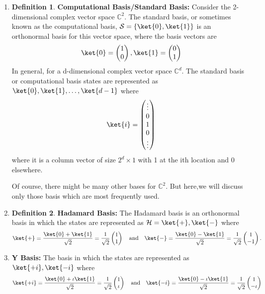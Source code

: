 \documentclass[12pt, oneside]{book}
\theoremstyle{definition}
\newtheorem{definition}{Definition}[section]
\theoremstyle{definition}
\theoremstyle{remark}
\begin{document}
\begin{enumerate}
    \item \begin{definition}
        \textbf{Computational Basis/Standard Basis:} Consider the 2-dimensional complex vector space $\mathbb{C}^2$. The standard basis, or sometimes known as the computational basis, $\mathcal{S}=\{\ket{0},\ket{1}\}$ is an orthonormal basis for this vector space, where the basis vectors are
        \[
        \ket{0}=\begin{pmatrix} 1 \\ 0 \end{pmatrix}, \ket{1}=\begin{pmatrix} 0 \\ 1 \end{pmatrix}
        \]
        In general, for a d-dimensional complex vector space $\mathbb{C}^d$. The standard basis or computational basis states are represented as $\ket{0},\ket{1},\ldots,\ket{d-1}$ where
        \[
        \ket{i}=\begin{pmatrix} \vdots \\ 0 \\ 1 \\ 0 \\ \vdots \\ \end{pmatrix}
        \]
        where it is a column vector of size $2^d \times 1$ with 1 at the ith location and 0 elsewhere.
    \end{definition}
Of course, there might be many other bases for $\mathbb{C}^2$. But here,we will discuss only those basis which are most frequently used.
    \item \begin{definition}\textbf{Hadamard Basis:} The Hadamard basis is an orthonormal basis in which the states are represented as $\mathcal{H}=\ket{+},\ket{-}$ where 
    \[\ket{+}=\dfrac{\ket{0}+\ket{1}}{\sqrt{2}}=\frac{1}{\sqrt{2}}\begin{pmatrix} 1 \\ 1 \end{pmatrix} \quad \text{and} \quad \ket{-}=\dfrac{\ket{0}-\ket{1}}{\sqrt{2}}=\frac{1}{\sqrt{2}}\begin{pmatrix} 1 \\-1\end{pmatrix}.
    \]
    \end{definition}
    \item \textbf{Y Basis:} The basis in which the states are represented as $\ket{+i},\ket{-i}$ where 
    \[\ket{+i}=\dfrac{\ket{0}+\iota\ket{1}}{\sqrt{2}}=\frac{1}{\sqrt{2}}\begin{pmatrix} 1 \\ \iota \end{pmatrix} \quad \text{and} \quad \ket{-i}=\dfrac{\ket{0}-\iota\ket{1}}{\sqrt{2}}=\frac{1}{\sqrt{2}}\begin{pmatrix} 1 \\ -\iota \end{pmatrix}
    \]
\end{enumerate}
\end{document}
